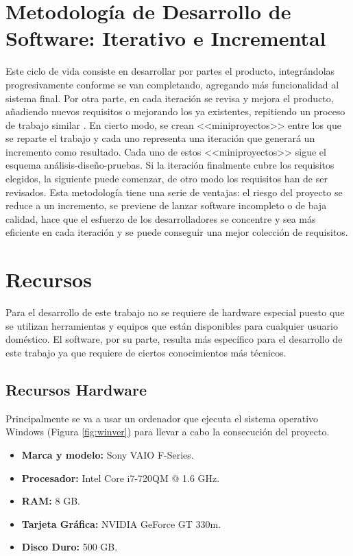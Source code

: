 \section{Metodología de Desarrollo de Software: Iterativo e Incremental}
Este ciclo de vida consiste en desarrollar por partes el producto, integrándolas progresivamente conforme se van completando, agregando más funcionalidad al sistema final. Por otra parte, en cada iteración se revisa y mejora el producto, añadiendo nuevos requisitos o mejorando los ya existentes, repitiendo un proceso de trabajo similar \cite{proyectosagiles.org}. En cierto modo, se crean <<miniproyectos>> entre los que se reparte el trabajo y cada uno representa una iteración que generará un incremento como resultado. Cada uno de estos <<miniproyectos>> sigue el esquema análisis-diseño-pruebas. Si la iteración finalmente cubre los requisitos elegidos, la siguiente puede comenzar, de otro modo los requisitos han de ser revisados. Esta metodología tiene una serie de ventajas: el riesgo del proyecto se reduce a un incremento, se previene de lanzar software incompleto o de baja calidad, hace que el esfuerzo de los desarrolladores se concentre y sea más eficiente en cada iteración y se puede conseguir una mejor colección de requisitos.

\clearpage

\section{Recursos}
Para el desarrollo de este trabajo no se requiere de hardware especial puesto que se utilizan herramientas y equipos que están disponibles para cualquier usuario doméstico. El software, por su parte, resulta más específico para el desarrollo de este trabajo ya que requiere de ciertos conocimientos más técnicos.

\subsection{Recursos Hardware}
Principalmente se va a usar un ordenador que ejecuta el sistema operativo Windows (Figura \ref{fig:winver}) para llevar a cabo la consecución del proyecto.

\begin{itemize}
	\item \textbf{Marca y modelo:} Sony VAIO F-Series.
	\item \textbf{Procesador:} Intel\textregistered{ } Core\texttrademark{ } i7-720QM @ 1.6 \acf{GHz}.
	\item \textbf{RAM:} 8 \acs{GB}.
	\item \textbf{Tarjeta Gráfica:} NVIDIA GeForce GT 330m.
	\item \textbf{Disco Duro:} 500 \acs{GB}.
\end{itemize}

